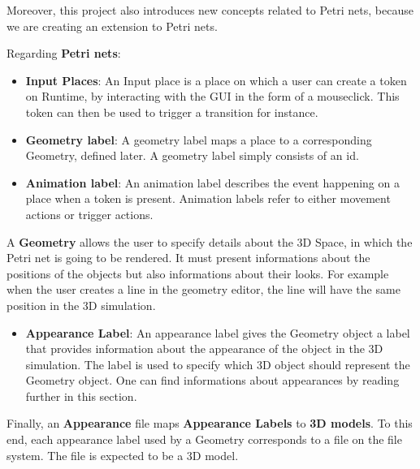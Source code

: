 Moreover, this project also introduces new concepts related to Petri nets, because we are creating an extension to Petri nets.

Regarding \textbf{Petri nets}:
\begin{itemize}
  \item \textbf{Input Places}: An Input place is a place on which a user can create a token on Runtime, by interacting with the GUI in the form of a mouseclick. This token can then be used to trigger a transition for instance.
  \item \textbf{Geometry label}: A geometry label maps a place to a corresponding Geometry, defined later.
  A geometry label simply consists of an id.

  \item \textbf{Animation label}: An animation label describes the event happening on a place when a token is present.
Animation labels refer to either movement actions or trigger actions.\end{itemize}

A \textbf{Geometry} allows the user to specify details about the 3D Space, in which the Petri net is going to be rendered. It must present informations about the positions of the objects but also informations about their looks. For example when the user creates a line in the geometry editor, the line will have the same position in the 3D simulation.

\begin{itemize}
  \item \textbf{Appearance Label}: An appearance label gives the Geometry object a label that provides information about the appearance of the object in the 3D simulation. The label is used to specify which 3D object should represent the Geometry object. One can find informations about appearances by reading further in this section.
\end{itemize}

Finally, an \textbf{Appearance} file maps \textbf{Appearance Labels} to \textbf{3D models}.
To this end, each appearance label used by a Geometry corresponds to a file on the file system. The file is expected to be a 3D model.

\newpage
